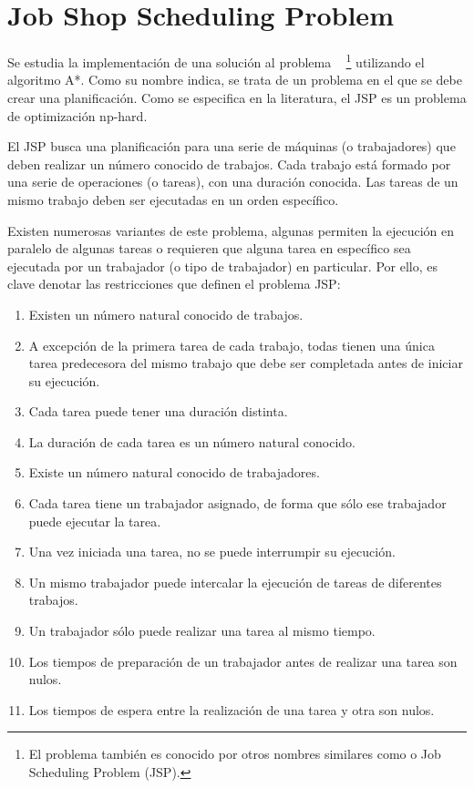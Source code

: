 
\section{Job Shop Scheduling Problem}

Se estudia la implementación de una solución al problema
~\cite{Yan77}
\footnote{El problema también es conocido por otros nombres similares
como  o Job Scheduling Problem (JSP).}
utilizando el algoritmo A*.
Como su nombre indica, se trata de un problema en el que se debe
crear una planificación.
Como se especifica en la literatura, el JSP es un problema de optimización np-hard.

El JSP busca una planificación para una serie de
máquinas (o trabajadores) que deben realizar un número conocido
de trabajos.
Cada trabajo está formado por una serie de operaciones (o tareas),
con una duración conocida.
Las tareas de un mismo trabajo deben ser ejecutadas en un orden específico.

Existen numerosas variantes de este problema,
algunas permiten la ejecución
en paralelo de algunas tareas o requieren que alguna tarea
en específico sea ejecutada por un trabajador (o tipo de trabajador)
en particular.
Por ello, es clave denotar las restricciones que definen el problema JSP\@:

\begin{enumerate}[start=0, itemsep=0.25px]
    \item Existen un número natural conocido de trabajos.
    \item A excepción de la primera tarea de cada trabajo,
    todas tienen una única tarea predecesora del mismo trabajo
    que debe ser completada antes de iniciar su ejecución.
    \item Cada tarea puede tener una duración distinta.
    \item La duración de cada tarea es un número natural conocido.
    \item Existe un número natural conocido de trabajadores.
    \item Cada tarea tiene un trabajador asignado,
    de forma que sólo ese trabajador puede ejecutar la tarea.
    \item Una vez iniciada una tarea, no se puede interrumpir su ejecución.
    \item Un mismo trabajador puede intercalar la ejecución de tareas de diferentes trabajos.
    \item Un trabajador sólo puede realizar una tarea al mismo tiempo.
    \item Los tiempos de preparación de un trabajador antes de realizar una tarea son nulos.
    \item Los tiempos de espera entre la realización de una tarea y otra son nulos.
\end{enumerate}

